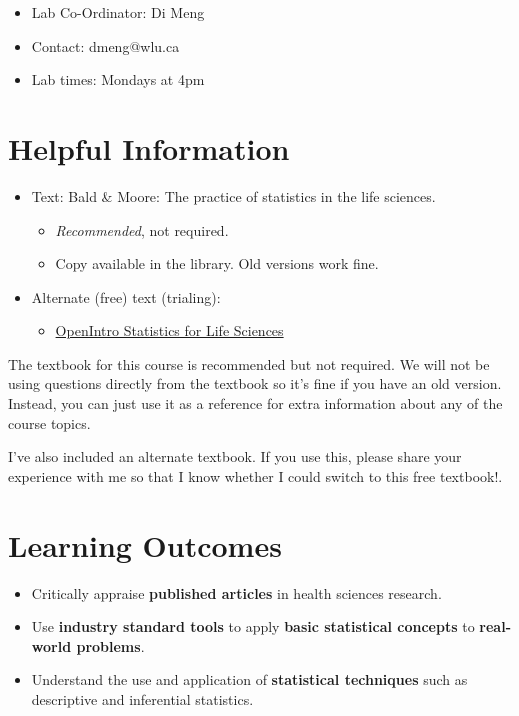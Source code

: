 \documentclass[
  letterpaper,
  DIV=11,
  numbers=noendperiod]{scrreprt}
\providecommand{\tightlist}{%
  \setlength{\itemsep}{0pt}\setlength{\parskip}{0pt}}\usepackage{longtable,booktabs,array}
\begin{document}
\pspace

\begin{itemize}
\tightlist
\item
  Lab Co-Ordinator: Di Meng
\item
  Contact: dmeng@wlu.ca
\item
  Lab times: Mondays at 4pm
\end{itemize}

\hypertarget{helpful-information}{%
\section{Helpful Information}\label{helpful-information}}

\begin{itemize}
\tightlist
\item
  Text: Bald \& Moore: The practice of statistics in the life sciences.

  \begin{itemize}
  \tightlist
  \item
    \emph{Recommended}, not required.
  \item
    Copy available in the library. Old versions work fine.\lspace
  \end{itemize}
\item
  Alternate (free) text (trialing):

  \begin{itemize}
  \tightlist
  \item
    \href{https://www.openintro.org/book/biostat/}{OpenIntro Statistics
    for Life Sciences}
  \end{itemize}
\end{itemize}

The textbook for this course is recommended but not required. We will
not be using questions directly from the textbook so it's fine if you
have an old version. Instead, you can just use it as a reference for
extra information about any of the course topics.

I've also included an alternate textbook. If you use this, please share
your experience with me so that I know whether I could switch to this
free textbook!.

\hypertarget{learning-outcomes}{%
\section{Learning Outcomes}\label{learning-outcomes}}

\begin{itemize}
\tightlist
\item
  Critically appraise \textbf{published articles} in health sciences
  research.\lspace
\item
  Use \textbf{industry standard tools} to apply \textbf{basic
  statistical concepts} to \textbf{real-world problems}.\lspace
\item
  Understand the use and application of \textbf{statistical techniques}
  such as descriptive and inferential statistics.
\end{itemize}
\end{document}
